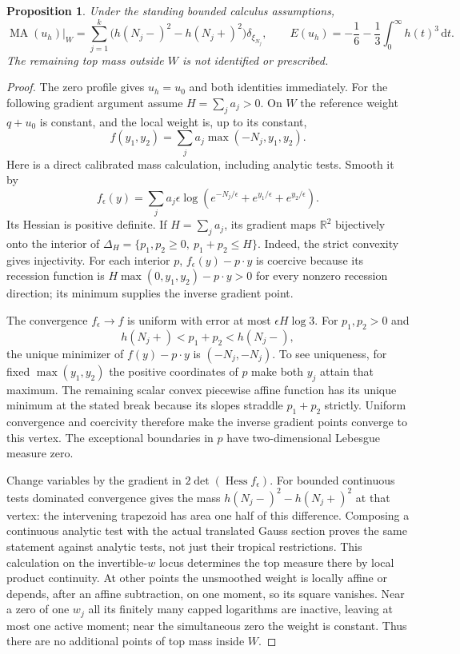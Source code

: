 \documentclass[11pt]{article}
\newtheorem{proposition}[theorem]{Proposition}
\newcommand{\MA}{\operatorname{MA}}
\newcommand{\R}{\mathbb R}
\begin{document}
\begin{proposition}\label{prop:energy}
Under the standing bounded calculus assumptions,
\[
 \MA(u_h)|_W=\sum_{j=1}^k
       \bigl(h(N_j-)^2-h(N_j+)^2\bigr)\delta_{\xi_{N_j}},
 \qquad E(u_h)=-\frac16-\frac13\int_0^\infty h(t)^3\,\mathrm dt.
\]
The remaining top mass outside $W$ is not identified or prescribed.
\end{proposition}
\begin{proof}
The zero profile gives $u_h=u_0$ and both identities immediately.
For the following gradient argument assume $H=\sum_j a_j>0$.
On $W$ the reference weight $q+u_0$ is constant, and the local weight is,
up to its constant,
\[
 f(y_1,y_2)=\sum_j a_j\max(-N_j,y_1,y_2).
\]
Here is a direct calibrated mass calculation, including analytic tests.
Smooth it by
\[
 f_\epsilon(y)=\sum_j a_j\epsilon
        \log(e^{-N_j/\epsilon}+e^{y_1/\epsilon}+e^{y_2/\epsilon}).
\]
Its Hessian is positive definite. If $H=\sum_j a_j$, its gradient maps
$\R^2$ bijectively onto the interior of
$\Delta_H=\{p_1,p_2\geq0,\ p_1+p_2\leq H\}$.
Indeed, the strict convexity gives injectivity. For each interior $p$,
$f_\epsilon(y)-p\cdot y$ is coercive because its recession function is
$H\max(0,y_1,y_2)-p\cdot y>0$ for every nonzero recession direction;
its minimum supplies the inverse gradient point.

The convergence $f_\epsilon\to f$ is uniform with error at most
$\epsilon H\log3$. For $p_1,p_2>0$ and
\[
 h(N_j+)<p_1+p_2<h(N_j-),
\]
the unique minimizer of $f(y)-p\cdot y$ is $(-N_j,-N_j)$.
To see uniqueness, for fixed $\max(y_1,y_2)$ the positive coordinates
of $p$ make both $y_j$ attain that maximum. The remaining scalar
convex piecewise affine function has its unique minimum at the stated
break because its slopes straddle $p_1+p_2$ strictly.
Uniform convergence and coercivity therefore make the inverse gradient
points converge to this vertex. The exceptional boundaries in $p$ have
two-dimensional Lebesgue measure zero.

Change variables by the gradient in $2\det(\operatorname{Hess}f_\epsilon)$.
For bounded continuous tests dominated convergence gives the mass
$h(N_j-)^2-h(N_j+)^2$ at that vertex: the intervening trapezoid has
area one half of this difference. Composing a continuous analytic test
with the actual translated Gauss section proves the same statement
against analytic tests, not just their tropical restrictions.
This calculation on the invertible-$w$ locus determines the top measure
there by local product continuity. At other points the unsmoothed weight
is locally affine or depends, after an affine subtraction, on one moment,
so its square vanishes. Near a zero of one $w_j$ all its finitely many
capped logarithms are inactive, leaving at most one active moment;
near the simultaneous zero the weight is constant. Thus there are no
additional points of top mass inside $W$.


\end{proof}
\end{document}
